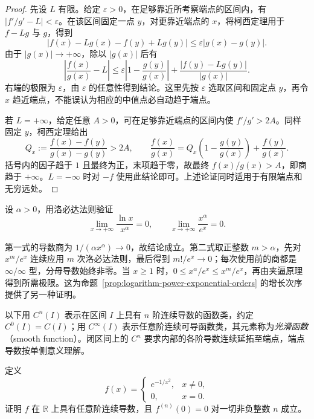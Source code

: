 \documentclass[UTF8,12pt,a4paper,fontset=fandol]{ctexbook}
\begin{document}
\begin{proof}
先设 $L$ 有限。给定 $\varepsilon>0$，在足够靠近所考察端点的区间内，有 $|f'/g'-L|<\varepsilon$。在该区间固定一点 $y$，对更靠近端点的 $x$，将柯西定理用于 $f-Lg$ 与 $g$，得到
\[
    |f(x)-Lg(x)-f(y)+Lg(y)|
    \leq\varepsilon|g(x)-g(y)|.
\]
由于 $|g(x)|\to+\infty$，除以 $|g(x)|$ 后有
\[
    \left|\frac{f(x)}{g(x)}-L\right|
    \leq\varepsilon\left|1-\frac{g(y)}{g(x)}\right|
       +\frac{|f(y)-Lg(y)|}{|g(x)|}.
\]
右端的极限为 $\varepsilon$，由 $\varepsilon$ 的任意性得到结论。这里先按 $\varepsilon$ 选取区间和固定点 $y$，再令 $x$ 趋近端点，不能误认为相应的中值点必自动趋于端点。

若 $L=+\infty$，给定任意 $A>0$，可在足够靠近端点的区间内使 $f'/g'>2A$。同样固定 $y$，柯西定理给出
\[
    Q_x:=\frac{f(x)-f(y)}{g(x)-g(y)}>2A,
    \qquad
    \frac{f(x)}{g(x)}
    =Q_x\left(1-\frac{g(y)}{g(x)}\right)+\frac{f(y)}{g(x)}.
\]
括号内的因子趋于 $1$ 且最终为正，末项趋于零，故最终 $f(x)/g(x)>A$，即商趋于 $+\infty$。$L=-\infty$ 时对 $-f$ 使用此结论即可。上述论证同时适用于有限端点和无穷远处。
\end{proof}

\begin{example}
\label{ex:lhopital-growth-rates}
设 $\alpha>0$，用洛必达法则验证
\[
    \lim_{x\to+\infty}\frac{\ln x}{x^\alpha}=0,
    \qquad
    \lim_{x\to+\infty}\frac{x^\alpha}{e^x}=0.
\]
\end{example}

\begin{solve}
第一式的导数商为 $1/(\alpha x^\alpha)\to0$，故结论成立。第二式取正整数 $m>\alpha$，先对 $x^m/e^x$ 连续应用 $m$ 次洛必达法则，最后得到 $m!/e^x\to0$；每次使用前的商都是 $\infty/\infty$ 型，分母导数始终非零。当 $x\geq1$ 时，$0\leq x^\alpha/e^x\leq x^m/e^x$，再由夹逼原理得到所需极限。这为命题~\ref{prop:logarithm-power-exponential-orders} 的增长次序提供了另一种证明。
\end{solve}

以下用 $C^n(I)$ 表示在区间 $I$ 上具有 $n$ 阶连续导数的函数类，约定 $C^0(I)=C(I)$；用 $C^\infty(I)$ 表示任意阶连续可导函数类，其元素称为\emph{光滑函数}（smooth function）。闭区间上的 $C^n$ 要求内部的各阶导数连续延拓至端点，端点导数按单侧意义理解。

\begin{example}
\label{ex:smooth-flat-exponential-function}
定义
\[
    f(x)=
    \begin{cases}
        e^{-1/x^2},&x\neq0,\\
        0,&x=0.
    \end{cases}
\]
证明 $f$ 在 $\mathbb{R}$ 上具有任意阶连续导数，且 $f^{(n)}(0)=0$ 对一切非负整数 $n$ 成立。
\end{example}
\end{document}
